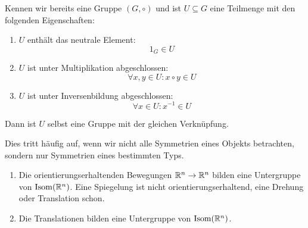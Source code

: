 \begin{example}[Untergruppen]
Kennen wir bereits eine Gruppe $(G,\circ)$ und ist $U\subseteq G$ eine Teilmenge mit den folgenden Eigenschaften:
\begin{enumerate}[label=(UG\arabic*)]
\item $U$ enthält das neutrale Element:
\[1_G\in U\]
\item $U$ ist unter Multiplikation abgeschlossen:
\[\forall x,y\in U: x\circ y\in U\]
\item $U$ ist unter Inversenbildung abgeschlossen:
\[\forall x\in U: x^{-1}\in U\]
\end{enumerate}
Dann ist $U$ selbst eine Gruppe mit der gleichen Verknüpfung.

Dies tritt häufig auf, wenn wir nicht alle Symmetrien eines Objekts betrachten, sondern nur Symmetrien eines bestimmten Typs.

\begin{enumerate}
\item Die orientierungserhaltenden Bewegungen $\mathbb{R}^n\to\mathbb{R}^n$ bilden eine Untergruppe von $\operatorname{Isom}(\mathbb{R}^n)$. Eine Spiegelung ist nicht orientierungserhaltend, eine Drehung oder Translation schon.
\item Die Translationen bilden eine Untergruppe von $\operatorname{Isom}(\mathbb{R}^n)$.
\end{enumerate}
\end{example}

